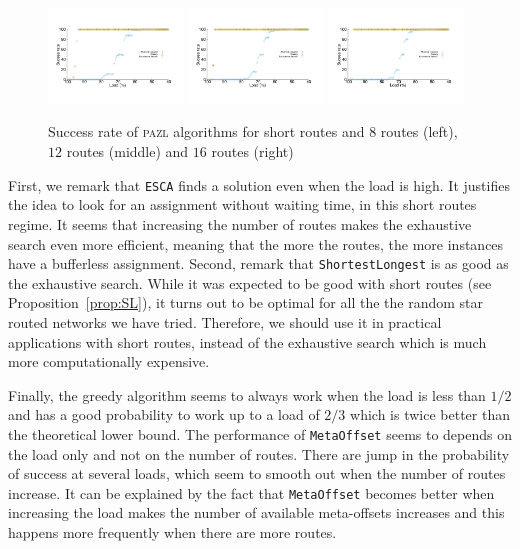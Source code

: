 \documentclass[a4paper,10pt]{article}
\newcommand\shortestlongest{\texttt{ShortestLongest}\xspace}
\newcommand\metaoffset{\texttt{MetaOffset}\xspace}
\newcommand\ESCA{\texttt{ESCA}\xspace}
\newcommand\pazl{\textsc{pazl}\xspace}
\begin{document}
      

      \begin{figure}[h]
      \begin{center}
	 \includegraphics[width=0.32\textwidth]{pazlshort8.pdf}
	 \includegraphics[width=0.32\textwidth]{pazlshort12.pdf}
	 \includegraphics[width=0.32\textwidth]{pazlshort16.pdf}
      \end{center}
      \caption{Success rate of \pazl algorithms for short routes and $8$ routes (left), $12$ routes (middle) and $16$ routes (right)}\label{fig:short}
      \end{figure}
      First, we remark that \ESCA finds a solution even when the load is high. It justifies the idea to look for an assignment without waiting time, in this short routes regime. 
       It seems that increasing the number of routes makes the exhaustive search even more efficient, meaning that the more the routes, the more instances have a bufferless assignment. 
       Second, remark that \shortestlongest is as good as the exhaustive search. While it was expected to be good with short routes (see Proposition~\ref{prop:SL}), it turns out to be optimal for all the the random star routed networks we have tried. Therefore, we should use it in practical applications with short routes, instead of the exhaustive search which is much more computationally expensive. 

       Finally, the greedy algorithm seems to always work when the load is less than $1/2$ and has a good probability to work up to a load of $2/3$ which is twice better than the theoretical lower bound. The performance of \metaoffset seems to depends on the load only and not on the number of routes. There are jump in the probability of success at several loads, which seem to smooth out when the number of routes increase. It can be explained by the fact that \metaoffset becomes better when increasing the load makes the number of available meta-offsets increases and this happens more frequently when there are more routes.
      
\end{document}
